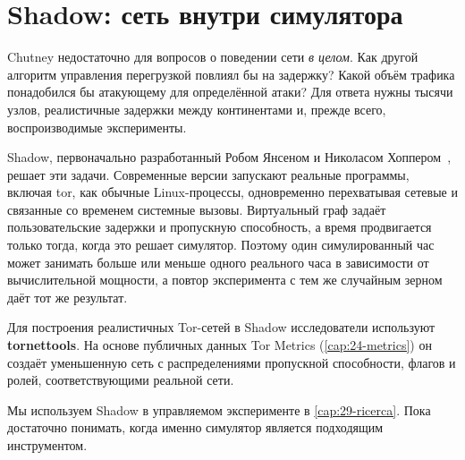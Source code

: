 \section{Shadow: сеть внутри симулятора}\label{sec:rp-shadow}

Chutney недостаточно для вопросов о поведении сети \emph{в целом}. Как другой алгоритм управления перегрузкой повлиял бы на задержку? Какой объём трафика понадобился бы атакующему для определённой атаки? Для ответа нужны тысячи узлов, реалистичные задержки между континентами и, прежде всего, воспроизводимые эксперименты.

Shadow, первоначально разработанный Робом Янсеном и Николасом Хоппером~\cite{jansen2012shadow}, решает эти задачи. Современные версии запускают реальные программы, включая tor, как обычные Linux-процессы, одновременно перехватывая сетевые и связанные со временем системные вызовы. Виртуальный граф задаёт пользовательские задержки и пропускную способность, а время продвигается только тогда, когда это решает симулятор. Поэтому один симулированный час может занимать больше или меньше одного реального часа в зависимости от вычислительной мощности, а повтор эксперимента с тем же случайным зерном даёт тот же результат.

Для построения реалистичных Tor-сетей в Shadow исследователи используют \textbf{tornettools}. На основе публичных данных Tor Metrics (\cref{cap:24-metrics}) он создаёт уменьшенную сеть с распределениями пропускной способности, флагов и ролей, соответствующими реальной сети.

Мы используем Shadow в управляемом эксперименте в \cref{cap:29-ricerca}. Пока достаточно понимать, когда именно симулятор является подходящим инструментом.

